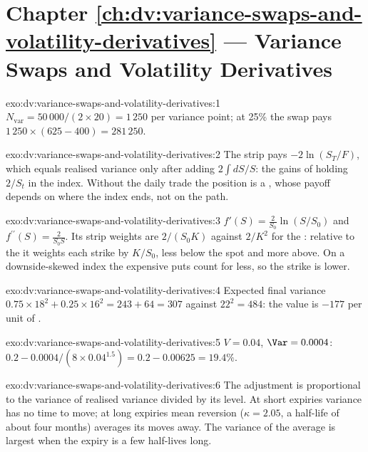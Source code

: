 \section*{Chapter \ref{ch:dv:variance-swaps-and-volatility-derivatives} --- Variance Swaps and Volatility Derivatives}

\begin{solution}{exo:dv:variance-swaps-and-volatility-derivatives:1}
$N_{\mathrm{var}}=50\,000/(2\times20)=1\,250$ per variance point; at 25\% the swap pays
$1\,250\times(625-400)=281\,250$.
\end{solution}

\begin{solution}{exo:dv:variance-swaps-and-volatility-derivatives:2}
The strip pays $-2\ln(S_T/F)$, which equals realised variance only after adding $2\int dS/S$: the gains of holding
$2/S_t$ in the index. Without the daily trade the position is a , whose payoff depends on where the
index ends, not on the path.
\end{solution}

\begin{solution}{exo:dv:variance-swaps-and-volatility-derivatives:3}
$f'(S)=\frac2{S_0}\ln(S/S_0)$ and $f^{\prime\prime}(S)=\frac2{S_0S}$. Its strip weights are $2/(S_0K)$ against $2/K^2$ for the
: relative to the  it weights each strike by $K/S_0$, less below the spot and more above.
On a downside-skewed index the expensive puts count for less, so the strike is lower.
\end{solution}

\begin{solution}{exo:dv:variance-swaps-and-volatility-derivatives:4}
Expected final variance $0.75\times18^2+0.25\times16^2=243+64=307$ against $22^2=484$: the value is $-177$ per unit of
.
\end{solution}

\begin{solution}{exo:dv:variance-swaps-and-volatility-derivatives:5}
$V=0.04$, $\Var=0.0004$: $0.2-0.0004/(8\times0.04^{1.5})=0.2-0.00625=19.4\%$.
\end{solution}

\begin{solution}{exo:dv:variance-swaps-and-volatility-derivatives:6}
The adjustment is proportional to the variance of realised variance divided by its level. At short expiries
variance has no time to move; at long expiries mean reversion ($\kappa=2.05$, a half-life of about four months)
averages its moves away. The variance of the average is largest when the expiry is a few half-lives long.
\end{solution}


